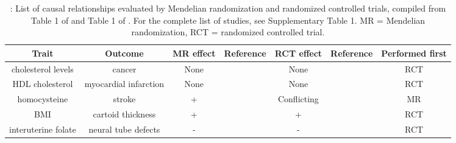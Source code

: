 \documentclass[11pt,titlepage]{article}
\begin{document}
\begin{table}[htdp]
\caption{: List of causal relationships evaluated by Mendelian randomization and randomized controlled trials, compiled from Table 1 of \citet{Davey-Smith:2014aa} and Table 1 of \citet{burgess2015mendelian}. For the complete list of studies, see Supplementary Table 1. MR = Mendelian randomization, RCT = randomized controlled trial.}
\begin{center}
\begin{footnotesize}
\tabcolsep=0.11cm
\begin{tabular}{|c|c|c|c|c|c|c|}
\hline
Trait & Outcome & MR effect & Reference & RCT effect & Reference & Performed first \\
\hline
cholesterol levels & cancer & None & \cite{Trompet:2009aa}  & None & \cite{Dale:2006aa} & RCT \\
HDL cholesterol & myocardial infarction & None & \cite{Voight:2012aa} &  None & \cite{Barter:2007aa} & RCT \\
homocysteine & stroke & + &  \cite{Casas:2005aa} & Conflicting & \cite{Huo:2015aa, Study-of-the-Effectiveness-of-Additional-Reductions-in-Cholesterol-and-Homocysteine-SEARCH-Collaborative-Group:2010aa} & MR \\
BMI & cartoid thickness & + & \cite{Kivimaki:2008ab} & + & \citep{Shai:2010aa, Hjerkinn:2006aa} & RCT \\
interuterine folate & neural tube defects & -& \cite{Smith:2003ab} &  - & \cite{mrc1991prevention} &RCT \\
\hline
\end{tabular}
\end{footnotesize}
\end{center}
\label{default} \label{t_table}
\end{table}%
\end{document}
